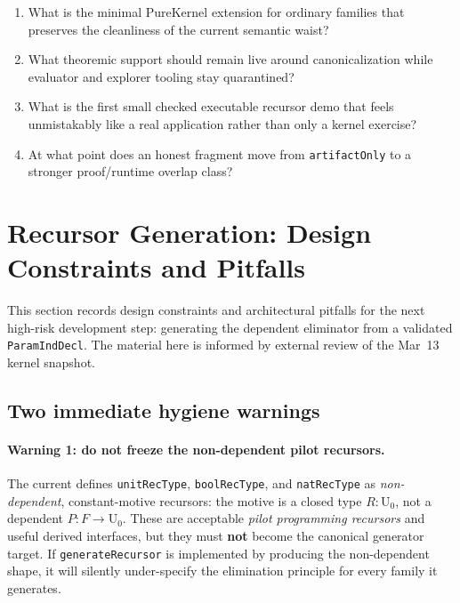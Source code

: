 \documentclass[11pt]{article}
\theoremstyle{remark}
\newcommand{\code}[1]{\texttt{#1}}
\newcommand{\codepath}[1]{\path{#1}}
\newcommand{\leanref}[1]{\texttt{#1}}
\begin{document}
\begin{enumerate}
  \item What is the minimal PureKernel extension for ordinary families that
  preserves the cleanliness of the current semantic waist?
  \item What theoremic support should remain live around canonicalization while
  evaluator and explorer tooling stay quarantined?
  \item What is the first small checked executable recursor demo that feels
  unmistakably like a real application rather than only a kernel exercise?
  \item At what point does an honest fragment move from
  \code{artifactOnly} to a stronger proof/runtime overlap class?
\end{enumerate}

\section{Recursor Generation: Design Constraints and Pitfalls}
\label{sec:recursor-design}

This section records design constraints and architectural pitfalls for the
next high-risk development step: generating the dependent eliminator from a
validated \leanref{ParamIndDecl}.
The material here is informed by external review of the Mar~13 kernel snapshot.

\subsection{Two immediate hygiene warnings}

\paragraph{Warning 1: do not freeze the non-dependent pilot recursors.}
The current \codepath{RecursorDecl.lean} defines
\code{unitRecType}, \code{boolRecType}, and \code{natRecType} as
\emph{non-dependent}, constant-motive recursors:
the motive is a closed type $R : \mathrm{U}_0$, not a dependent
$P : F \to \mathrm{U}_0$.
These are acceptable \emph{pilot programming recursors} and useful derived
interfaces, but they must \textbf{not} become the canonical generator target.
If \leanref{generateRecursor} is implemented by producing the non-dependent
shape, it will silently under-specify the elimination principle for every
family it generates.
\end{document}
